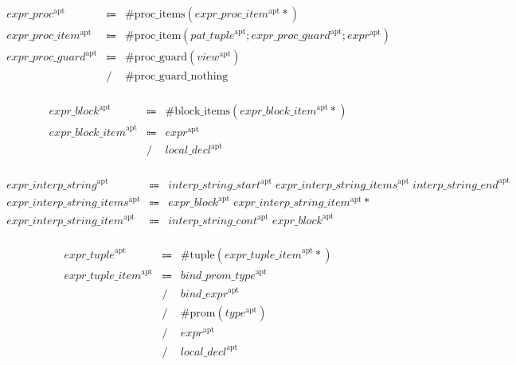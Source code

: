 \begin{align*}
    \begin{array}{rcll}
        \mathit{expr\_proc}^\mathrm{apt}
        &\Coloneq &\mathrm{\#proc\_items}(\mathit{expr\_proc\_item}^\mathrm{apt}{*}) \\
        \mathit{expr\_proc\_item}^\mathrm{apt}
        &\Coloneq &\mathrm{\#proc\_item}(\mathit{pat\_tuple}^\mathrm{apt}; \mathit{expr\_proc\_guard}^\mathrm{apt}; \mathit{expr}^\mathrm{apt}) \\
        \mathit{expr\_proc\_guard}^\mathrm{apt}
        &\Coloneq &\mathrm{\#proc\_guard}(\mathit{view}^\mathrm{apt}) \\
        &\mathrel{/} &\mathrm{\#proc\_guard\_nothing}
    \end{array}
\end{align*}

\begin{align*}
    \begin{array}{rcll}
        \mathit{expr\_block}^\mathrm{apt}
        &\Coloneq &\mathrm{\#block\_items}(\mathit{expr\_block\_item}^\mathrm{apt}{*}) \\
        \mathit{expr\_block\_item}^\mathrm{apt}
        &\Coloneq &\mathit{expr}^\mathrm{apt} \\
        &\mathrel{/} &\mathit{local\_decl}^\mathrm{apt}
    \end{array}
\end{align*}

\begin{align*}
    \begin{array}{rcll}
        \mathit{expr\_interp\_string}^\mathrm{apt}
        &\Coloneq &\mathit{interp\_string\_start}^\mathrm{apt}\; \mathit{expr\_interp\_string\_items}^\mathrm{apt}\; \mathit{interp\_string\_end}^\mathrm{apt} \\
        \mathit{expr\_interp\_string\_items}^\mathrm{apt}
        &\Coloneq &\mathit{expr\_block}^\mathrm{apt}\; \mathit{expr\_interp\_string\_item}^\mathrm{apt}{*} \\
        \mathit{expr\_interp\_string\_item}^\mathrm{apt}
        &\Coloneq &\mathit{interp\_string\_cont}^\mathrm{apt}\; \mathit{expr\_block}^\mathrm{apt}
    \end{array}
\end{align*}

\begin{align*}
    \begin{array}{rcll}
        \mathit{expr\_tuple}^\mathrm{apt}
        &\Coloneq &\mathrm{\#tuple}(\mathit{expr\_tuple\_item}^\mathrm{apt}{*}) \\
        \mathit{expr\_tuple\_item}^\mathrm{apt}
        &\Coloneq &\mathit{bind\_prom\_type}^\mathrm{apt} \\
        &\mathrel{/} &\mathit{bind\_expr}^\mathrm{apt} \\
        &\mathrel{/} &\mathrm{\#prom}(\mathit{type}^\mathrm{apt}) \\
        &\mathrel{/} &\mathit{expr}^\mathrm{apt} \\
        &\mathrel{/} &\mathit{local\_decl}^\mathrm{apt}
    \end{array}
\end{align*}

